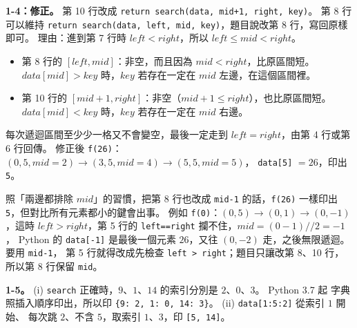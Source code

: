 \begin{pastsoln}
\textbf{1-4：修正。} 第 10 行改成 \texttt{return search(data, mid+1, right, key)}。 第 8 行可以維持
\texttt{return search(data, left, mid, key)}，題目說改第 8 行，寫回原樣即可。 理由：進到第 7 行時
$\mathit{left} < \mathit{right}$，所以 $\mathit{left} \le \mathit{mid} < \mathit{right}$。
\begin{itemize}
\item 第 8 行的 $[\mathit{left}, \mathit{mid}]$：非空，而且因為 $\mathit{mid} < \mathit{right}$，比原區間短。
$\mathit{data}[\mathit{mid}] > \mathit{key}$ 時，$\mathit{key}$ 若存在一定在 $\mathit{mid}$ 左邊，在這個區間裡。
\item 第 10 行的 $[\mathit{mid} + 1, \mathit{right}]$：非空（$\mathit{mid} + 1 \le \mathit{right}$），也比原區間短。
$\mathit{data}[\mathit{mid}] < \mathit{key}$ 時，$\mathit{key}$ 若存在一定在 $\mathit{mid}$ 右邊。
\end{itemize}
每次遞迴區間至少少一格又不會變空，最後一定走到 $\mathit{left} = \mathit{right}$，由第 4 行或第 6 行回傳。
修正後 \texttt{f(26)}：$(0, 5, \mathit{mid}{=}2) \to (3, 5, \mathit{mid}{=}4) \to (5, 5, \mathit{mid}{=}5)$，
\texttt{data[5]} $= 26$，印出 \texttt{5}。

照「兩邊都排除 $\mathit{mid}$」的習慣，把第 8 行也改成 \texttt{mid-1} 的話，\texttt{f(26)} 一樣印出
\texttt{5}，但對比所有元素都小的鍵會出事。 例如 \texttt{f(0)}：$(0, 5) \to (0, 1) \to (0, -1)$，這時
$\mathit{left} > \mathit{right}$，第 5 行的 \texttt{left==right} 攔不住，$\mathit{mid} = (0 - 1) /\!/ 2 = -1$，
Python 的 \texttt{data[-1]} 是最後一個元素 $26$，又往 $(0, -2)$ 走，之後無限遞迴。 要用 \texttt{mid-1}，
第 5 行就得改成先檢查 \texttt{left > right}；題目只讓改第 8、10 行，所以第 8 行保留 \texttt{mid}。

\textbf{1-5。} (i) \texttt{search} 正確時，$9$、$1$、$14$ 的索引分別是 $2$、$0$、$3$。 Python 3.7 起
字典照插入順序印出，所以印 \texttt{\{9: 2, 1: 0, 14: 3\}}。 (ii) \texttt{data[1:5:2]} 從索引 $1$ 開始、
每次跳 $2$、不含 $5$，取索引 $1$、$3$，印 \texttt{[5, 14]}。
\end{pastsoln}
